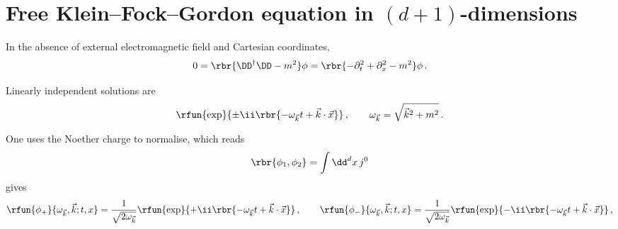 \documentclass[a4paper]{article}
\numberwithin{equation}{subsection}
\begin{document}
\section{Free Klein--Fock--Gordon equation in $(d+1)$-dimensions}

In the absence of external electromagnetic field and Cartesian coordinates,
\begin{align}
0 = \rbr{\DD^{\dagger} \DD - m^2}\phi =
	\rbr{-\partial_t^2+\partial_x^2 - m^2}\phi\,.
\end{align}

Linearly independent solutions are
\begin{align}
\rfun{\exp}{\pm\ii\rbr{-\omega_{\vec{k}} t + \vec{k}\cdot\vec{x}}}\,,
\qquad
\omega_{\vec{k}} = \sqrt{\vec{k}^2 + m^2}\,.
\end{align}

One uses the Noether charge to normalise, which reads
\begin{align}
\rbr{\phi_1, \phi_2} = \int \dd^d x\, j^{0}
\end{align}
gives
\begin{align}
\rfun{\phi_{+}}{\omega_{\vec{k}},\vec{k}; t, x} = 
\frac{1}{\sqrt{2\omega_{\vec{k}}}}
\rfun{\exp}{+\ii\rbr{-\omega_{\vec{k}} t + \vec{k}\cdot\vec{x}}}\,,
\qquad
\rfun{\phi_{-}}{\omega_{\vec{k}},\vec{k}; t, x} =
\frac{1}{\sqrt{2\omega_{\vec{k}}}}
\rfun{\exp}{-\ii\rbr{-\omega_{\vec{k}} t + \vec{k}\cdot\vec{x}}}\,,
\end{align}


%


\end{document}
